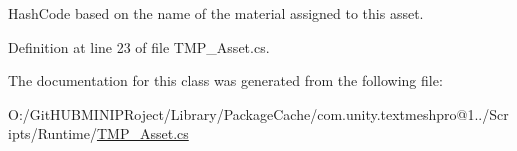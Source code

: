 Hash\+Code based on the name of the material assigned to this asset. 



Definition at line 23 of file T\+M\+P\+\_\+\+Asset.\+cs.



The documentation for this class was generated from the following file\+:\begin{DoxyCompactItemize}
\item 
O\+:/\+Git\+H\+U\+B\+M\+I\+N\+I\+P\+Roject/\+Library/\+Package\+Cache/com.\+unity.\+textmeshpro@1../\+Scripts/\+Runtime/\mbox{\hyperlink{_t_m_p___asset_8cs}{T\+M\+P\+\_\+\+Asset.\+cs}}\end{DoxyCompactItemize}
